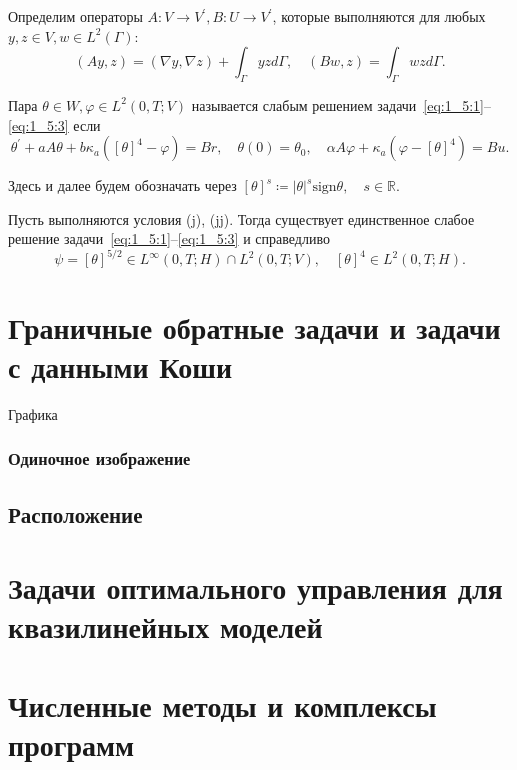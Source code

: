 \begin{frame}
    Определим операторы $A: V \rightarrow V^{\prime}, B: U \rightarrow V^{\prime}$,
    которые выполняются для любых $y, z \in V, w \in L^{2}(\Gamma)$:
    \[
        (A y, z)=(\nabla y, \nabla z)+\int_{\Gamma} y z d \Gamma, \quad(B w, z)=\int_{\Gamma} w z d \Gamma.
    \]

    \begin{definition}
        Пара $\theta \in W, \varphi \in L^{2}(0, T ; V)$
        называется слабым решением задачи~\eqref{eq:1_5:1}--\eqref{eq:1_5:3}
        если
        \begin{equation}
            \label{eq:1_5:weak}
            \theta^{\prime}+a A \theta+b \kappa_{a}\left([\theta]^{4}-\varphi\right)=B r,
            \quad \theta(0)=\theta_{0}, \quad \alpha A \varphi+\kappa_{a}\left(\varphi-[\theta]^{4}\right)=B u.
        \end{equation}
    \end{definition}
    Здесь и далее будем обозначать через
    $[\theta]^s \coloneqq |\theta|^s \mathrm{sign}\theta,\quad s \in \mathbb{R}$.
    \begin{lemma}[1.20]
        Пусть выполняются условия (j), (jj).
        Тогда существует единственное слабое решение задачи~\eqref{eq:1_5:1}--\eqref{eq:1_5:3} и справедливо
        \[
            \psi=[\theta]^{5 / 2} \in L^{\infty}(0, T ; H) \cap L^{2}(0, T ; V),
            \quad[\theta]^{4} \in L^{2}(0, T ; H).
        \]
    \end{lemma}

\end{frame}


\section{Граничные обратные задачи и задачи с данными Коши}\label{sec:-------}
\begin{frame}
    \begin{center}
        \Huge
        Графика
    \end{center}
\end{frame}


\begin{frame}
    \frametitle{Одиночное изображение}
    \centering
\end{frame}

\begin{frame}

\end{frame}

\subsection{Расположение}\label{subsec:}

\begin{frame}

\end{frame}


\section{Задачи оптимального управления для квазилинейных моделей}\label{sec:-----}


\section{Численные методы и комплексы программ}\label{sec:----}
